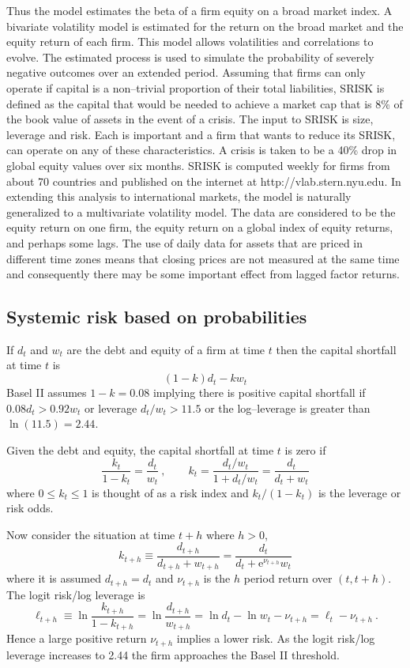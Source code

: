 \documentclass[authoryear]{elsarticle}
\newcommand{\e}{\mathrm{e}}
\newcommand{\cq}{\ , \qquad}
\begin{document}
Thus the model  estimates the beta of a firm equity on a broad market index.
A bivariate volatility model is estimated for the return on the broad market and the equity return of each firm. This model allows volatilities and correlations to evolve.    The estimated process is used to simulate the probability of severely negative outcomes over an extended period. Assuming that firms can only operate if capital is a non--trivial proportion of their total liabilities, SRISK is defined as the capital that would be needed to achieve a market cap that is 8\% of the book value of assets in the event of a crisis. The input to SRISK is size, leverage and risk. Each is important and a firm that wants to reduce its SRISK, can operate on any of these characteristics. A crisis is taken to be a 40\% drop in global equity values over six months. SRISK is computed weekly for firms from about 70 countries and published on the internet at http://vlab.stern.nyu.edu.  In extending this analysis to international markets, the model is naturally generalized to a multivariate volatility model. The data are considered to be the equity return on one firm, the equity return on a global index of equity returns, and perhaps some lags. The use of daily data for assets that are priced in different time zones means that closing prices are not measured at the same time and consequently there may be some important effect from lagged factor returns.

\subsection{Systemic risk based on probabilities}

If $d_t$ and $w_t$ are the debt and equity of a firm at time $t$ then the capital shortfall at time $t$ is 
$$
(1-k) d_t  - k w_t
$$
Basel II assumes $1-k=0.08$ implying there is  positive  capital shortfall if 
$
 0.08 d_t>0.92 w_t
$
or  leverage $d_t/w_t>11.5$ or the log--leverage is greater than $\ln(11.5)=2.44$.  
	
Given the debt and equity, the capital shortfall at time $t$ is zero if 
$$
\frac{k_t}{1-k_t} = \frac{d_t}{w_t}\cq k_t= \frac{d_t/w_t}{1+d_t/w_t} = \frac{d_t}{d_t+w_t}
$$
where $0\le k_t\le 1$  is thought of as a risk index and $k_t/(1-k_t)$ is the leverage or risk odds.   


Now consider the situation at time  $t+h$ where $h>0$, 
$$
 k_{t+h}\equiv\frac{d_{t+h}}{d_{t+h}+w_{t+h}} =  \frac{d_t}{d_t+\e^{\nu_{t+h}}w_t}
$$ 
where it is assumed $d_{t+h}=d_t$ and $\nu_{t+h}$ is the $h$ period return over $(t,t+h)$.  The   logit risk/log leverage is
$$
\ell_{t+h}\equiv\ln \frac{k_{t+h}}{1-k_{t+h}} = \ln \frac{d_{t+h}}{w_{t+h}} = \ln d_t - \ln w_t - \nu_{t+h} = \ell_t -\nu_{t+h} \ .
$$
Hence a large positive return $\nu_{t+h}$ implies a lower  risk.  As the logit risk/log leverage  increases to 2.44 the firm approaches the Basel II threshold.
\end{document}
